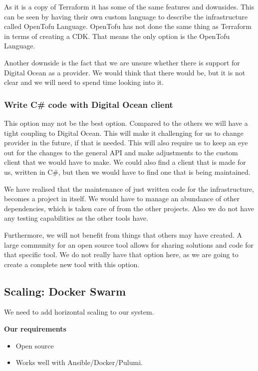 As it is a copy of Terraform it has some of the same features and downsides. This can be seen by having their own custom language to describe the infrastructure called OpenTofu Language. OpenTofu has not done the same thing as Terraform in terms of creating a CDK. That means the only option is the OpenTofu Language.

Another downside is the fact that we are unsure whether there is support for Digital Ocean as a provider. We would think that there would be, but it is not clear and we will need to spend time looking into it.

\subsubsection{Write C\# code with Digital Ocean client}

This option may not be the best option. Compared to the others we will have a tight coupling to Digital Ocean. This will make it challenging for us to change provider in the future, if that is needed. This will also require us to keep an eye out for the changes to the general API and make adjustments to the custom client that we would have to make. We could also find a client that is made for us, written in C\#, but then we would have to find one that is being maintained.

We have realised that the maintenance of just written code for the infrastructure, becomes a project in itself. We would have to manage an abundance of other dependencies, which is taken care of from the other projects. Also we do not have any testing capabilities as the other tools have.

Furthermore, we will not benefit from things that others may have created. A large community for an open source tool allows for sharing solutions and code for that specific tool. We do not really have that option here, as we are going to create a complete new tool with this option.

\subsection{Scaling: Docker Swarm}

We need to add horizontal scaling to our system.

\textbf{Our requirements}

\begin{itemize}
    \item Open source
    \item Works well with Ansible/Docker/Pulumi.
\end{itemize}


